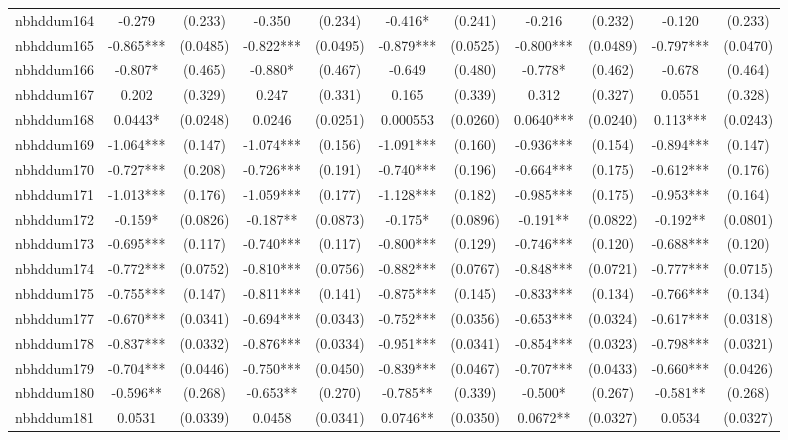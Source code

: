 \documentclass[]{article}
\begin{document}
\begin{tabular}{lcccccccccc}
nbhddum164 & -0.279 & (0.233) & -0.350 & (0.234) & -0.416* & (0.241) & -0.216 & (0.232) & -0.120 & (0.233) \\
nbhddum165 & -0.865*** & (0.0485) & -0.822*** & (0.0495) & -0.879*** & (0.0525) & -0.800*** & (0.0489) & -0.797*** & (0.0470) \\
nbhddum166 & -0.807* & (0.465) & -0.880* & (0.467) & -0.649 & (0.480) & -0.778* & (0.462) & -0.678 & (0.464) \\
nbhddum167 & 0.202 & (0.329) & 0.247 & (0.331) & 0.165 & (0.339) & 0.312 & (0.327) & 0.0551 & (0.328) \\
nbhddum168 & 0.0443* & (0.0248) & 0.0246 & (0.0251) & 0.000553 & (0.0260) & 0.0640*** & (0.0240) & 0.113*** & (0.0243) \\
nbhddum169 & -1.064*** & (0.147) & -1.074*** & (0.156) & -1.091*** & (0.160) & -0.936*** & (0.154) & -0.894*** & (0.147) \\
nbhddum170 & -0.727*** & (0.208) & -0.726*** & (0.191) & -0.740*** & (0.196) & -0.664*** & (0.175) & -0.612*** & (0.176) \\
nbhddum171 & -1.013*** & (0.176) & -1.059*** & (0.177) & -1.128*** & (0.182) & -0.985*** & (0.175) & -0.953*** & (0.164) \\
nbhddum172 & -0.159* & (0.0826) & -0.187** & (0.0873) & -0.175* & (0.0896) & -0.191** & (0.0822) & -0.192** & (0.0801) \\
nbhddum173 & -0.695*** & (0.117) & -0.740*** & (0.117) & -0.800*** & (0.129) & -0.746*** & (0.120) & -0.688*** & (0.120) \\
nbhddum174 & -0.772*** & (0.0752) & -0.810*** & (0.0756) & -0.882*** & (0.0767) & -0.848*** & (0.0721) & -0.777*** & (0.0715) \\
nbhddum175 & -0.755*** & (0.147) & -0.811*** & (0.141) & -0.875*** & (0.145) & -0.833*** & (0.134) & -0.766*** & (0.134) \\
nbhddum177 & -0.670*** & (0.0341) & -0.694*** & (0.0343) & -0.752*** & (0.0356) & -0.653*** & (0.0324) & -0.617*** & (0.0318) \\
nbhddum178 & -0.837*** & (0.0332) & -0.876*** & (0.0334) & -0.951*** & (0.0341) & -0.854*** & (0.0323) & -0.798*** & (0.0321) \\
nbhddum179 & -0.704*** & (0.0446) & -0.750*** & (0.0450) & -0.839*** & (0.0467) & -0.707*** & (0.0433) & -0.660*** & (0.0426) \\
nbhddum180 & -0.596** & (0.268) & -0.653** & (0.270) & -0.785** & (0.339) & -0.500* & (0.267) & -0.581** & (0.268) \\
nbhddum181 & 0.0531 & (0.0339) & 0.0458 & (0.0341) & 0.0746** & (0.0350) & 0.0672** & (0.0327) & 0.0534 & (0.0327) \\

\end{tabular}
\end{document}
